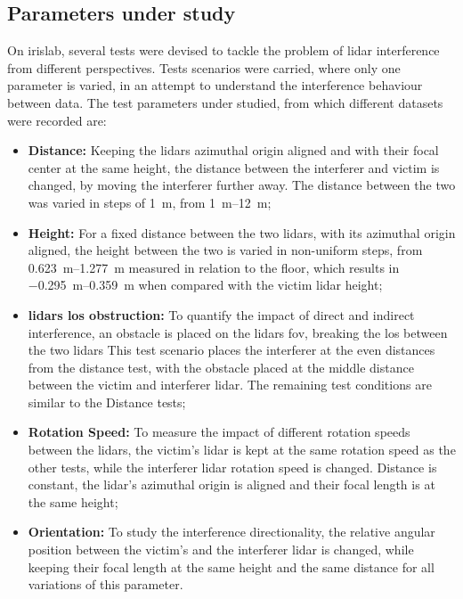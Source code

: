 \subsection{Parameters under study}
\label{subsec:lidar-interference:parameters-under-test}
On \ac{irislab}, several tests were devised to tackle the problem of \ac{lidar} interference from different perspectives. Tests scenarios were carried, where only one parameter is varied, in an attempt to understand the interference behaviour between data. The test parameters under studied, from which different datasets were recorded are:

\begin{itemize}
	\item \textbf{Distance:} Keeping the \acp{lidar} azimuthal origin aligned and with their focal center at the same height, the distance between the interferer and victim is changed, by moving the interferer further away. The distance between the two was varied in steps of \SI{1}{\meter}, from \SIrange{1}{12}{\meter};
	\item \textbf{Height:} For a fixed distance between the two \acp{lidar}, with its azimuthal origin aligned, the height between the two is varied in non-uniform steps, from \SIrange{0.623}{1.277}{\meter} measured in relation to the floor, which results in \SIrange{-0.295}{0.359}{\meter} when compared with the victim \ac{lidar} height;
	\item \textbf{\acp{lidar} \ac{los} obstruction:} To quantify the impact of direct and indirect interference, an obstacle is placed on the \acp{lidar} \ac{fov}, breaking the \ac{los} between the two \acp{lidar} This test scenario places the interferer at the even distances from the distance test, with the obstacle placed at the middle distance between the victim and interferer \ac{lidar}. The remaining test conditions are similar to the Distance tests;
	\item \textbf{Rotation Speed:} To measure the impact of different rotation speeds between the \acp{lidar}, the victim's \ac{lidar} is kept at the same rotation speed as the other tests, while the interferer \ac{lidar} rotation speed is changed. Distance is constant, the \ac{lidar}'s azimuthal origin is aligned and their focal length is at the same height;
	\item \textbf{Orientation:} To study the interference directionality, the relative angular position between the victim's and the interferer \ac{lidar} is changed, while keeping their focal length at the same height and the same distance for all variations of this parameter.
\end{itemize}


